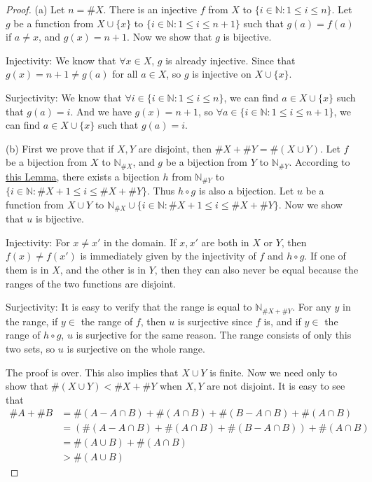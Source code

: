 \begin{proof}
(a) 
Let $n = \#X$. There is an injective  $f$ from $X$ to $\{i\in \mathbb{N}:1\leq i\leq n\}$. Let $g$ be a 
function from $X \cup \{x\}$ to $\{i\in \mathbb{N}:1\leq i\leq n+1\}$ such that $g(a) = f(a)$ if 
$a\neq x$, and $g(x) = n+1$. Now we show that $g$ is bijective.

Injectivity: We know that $\forall x \in X$, $g$ is already injective. Since that $g(x) = n+1 \neq g(a)$ 
for all $a \in X$, so $g$ is injective on $X \cup \{x\}$.

Surjectivity: We know that $\forall i \in \{i\in \mathbb{N}:1\leq i\leq n\}$, we can find 
$a \in X \cup \{x\}$ such that $g(a) = i$. And we have $g(x) = n+1$, so 
$\forall a \in \{i\in \mathbb{N}:1\leq i\leq n+1\}$, we can find $a \in X \cup \{x\}$ such that 
$g(a) = i$. 

(b)
First we prove that if $X,Y$ are disjoint, then $\#X + \#Y = \#(X\cup Y)$. Let $f$ be a bijection from $X$ 
to $\mathbb{N}_{\#X}$, and $g$ be a bijection from $Y$ to $\mathbb{N}_{\#Y}$. According to 
\hyperref[lem3.6.6]{this Lemma}, there exists a bijection $h$ from $\mathbb{N}_{\#Y}$ to 
$\{i\in \mathbb{N}:\#X+1\leq i \leq \#X+\#Y\}$. Thus $h \circ g$ is also a bijection. Let $u$ be a 
function from $X \cup Y$ to $\mathbb{N}_{\#X} \cup\{i\in \mathbb{N}:\#X+1\leq i \leq \#X+\#Y\}$. Now we 
show that $u$ is bijective.

Injectivity: For $x \neq x'$ in the domain. If $x,x'$ are both in $X$ or $Y$, then $f(x)\neq f(x')$ is 
immediately given by the injectivity of $f$ and $h \circ g$. If one of them is in $X$, and the other is 
in $Y$, then they can also never be equal because the ranges of the two functions are disjoint. 

Surjectivity: It is easy to verify that the range is equal to $\mathbb{N}_{\#X + \#Y}$. For any $y$ in the 
range, if $y \in$ the range of $f$, then $u$ is surjective since $f$ is, and if $y \in$ the range of $h 
\circ g$, $u$ is surjective for the same reason. The range consists of only this two sets, so $u$ is 
surjective on the whole range.

The proof is over. This also implies that $X \cup Y$ is finite. Now we need only to show that 
$\#(X \cup Y) < \#X + \#Y$ when $X,Y$ are not disjoint. It is easy to see that
\begin{align*}
\#A + \#B 
&= \#(A - A \cap B) + \#(A \cap B) + \#(B - A \cap B) + \#(A \cap B) \\
&= (\#(A - A \cap B) + \#(A \cap B) + \#(B - A \cap B)) + \#(A \cap B) \\
&= \#(A \cup B) + \#(A \cap B) \\
&> \#(A \cup B)
\end{align*}


\end{proof}
